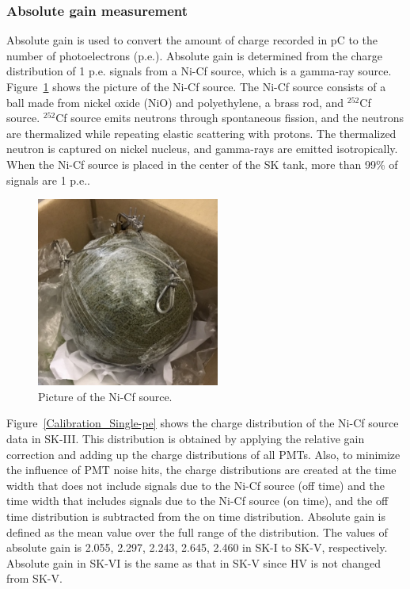 \subsubsection{Absolute gain measurement}
\vs\hs
Absolute gain is used to convert the amount of charge recorded in pC to the number of photoelectrons (p.e.).
Absolute gain is determined from the charge distribution of 1 p.e. signals from a Ni-Cf source, which is a gamma-ray source.
Figure~\ref{Calibration_Ni} shows the picture of the Ni-Cf source.
The Ni-Cf source consists of a ball made from nickel oxide (NiO) and polyethylene, a brass rod, and $^{\text{252}}$Cf source.
$^{\text{252}}$Cf source emits neutrons through spontaneous fission, and the neutrons are thermalized while repeating elastic scattering with protons.
The thermalized neutron is captured on nickel nucleus, and gamma-rays are emitted isotropically.
When the Ni-Cf source is placed in the center of the SK tank, more than 99\% of signals are 1 p.e..

\begin{figure}[H]
	\centering
	\includegraphics[width=6cm]{Figures/Calibration/Ni}
	\caption[Picture of the Ni-Cf source]{
	Picture of the Ni-Cf source.
	}\label{Calibration_Ni}
\end{figure}

\hs
Figure~\ref{Calibration_Single-pe} shows the charge distribution of the Ni-Cf source data in SK-III.
This distribution is obtained by applying the relative gain correction and adding up the charge distributions of all PMTs.
Also, to minimize the influence of PMT noise hits, the charge distributions are created at the time width that does not include signals due to the Ni-Cf source (off time) and the time width that includes signals due to the Ni-Cf source (on time), and the off time distribution is subtracted from the on time distribution.
Absolute gain is defined as the mean value over the full range of the distribution.
The values of absolute gain is 2.055, 2.297, 2.243, 2.645, 2.460 in SK-I to SK-V, respectively.
Absolute gain in SK-VI is the same as that in SK-V since HV is not changed from SK-V.

